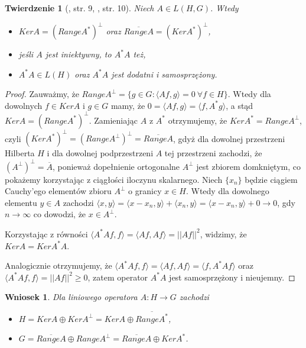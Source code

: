 \documentclass[man,mfiu]{mgrwms}
\newtheorem{tw}{Twierdzenie}[chapter]
\newtheorem{wn}{Wniosek}[chapter]
\begin{document}
\begin{tw}[\cite{iphde}, str. 9, \cite{kaipo}, str. 10] Niech $A\in L(H,G)$. Wtedy
\begin{itemize}
\item $KerA=(RangeA^*)^{\perp}$ oraz $\overline{RangeA}=(KerA^*)^{\perp}$,
\item jeśli $A$ jest iniektywny, to $A^*A$ też,
\item $A^*A\in L(H)$ oraz $A^*A$ jest dodatni i samosprzężony.
\end{itemize}
\end{tw}
\begin{proof}
Zauważmy, że $RangeA^{\perp}=\{g\in G\colon \langle Af,g\rangle =0\ \forall f\in H\}$. Wtedy dla dowolnych $f\in KerA$ i $g\in G$ mamy, że $0=\langle Af,g\rangle=\langle f,A^*g\rangle$, a stąd $KerA=(RangeA^*)^{\perp}$. Zamieniając $A$ z $A^*$ otrzymujemy, że $KerA^*=RangeA^{\perp}$, czyli $(KerA^*)^{\perp}=(RangeA^{\perp})^{\perp}=\overline{RangeA}$, gdyż dla dowolnej przestrzeni Hilberta $H$ i dla dowolnej podprzestrzeni $A$ tej przestrzeni zachodzi, że $(A^{\perp})^{\perp}=\overline{A}$, ponieważ dopełnienie ortogonalne $A^{\perp}$ jest zbiorem domkniętym, co pokażemy korzystając z ciągłości iloczynu skalarnego. Niech $\{x_n\}$ będzie ciągiem Cauchy'ego elementów zbioru $A^{\perp}$ o granicy $x\in H$. Wtedy dla dowolnego elementu $y\in A$ zachodzi $\langle x,y\rangle=\langle x-x_n,y\rangle + \langle x_n,y\rangle=\langle x-x_n,y\rangle + 0\to 0$, gdy $n\to \infty$ co dowodzi, że $x\in A^{\perp}$.

Korzystając z równości $\langle A^*Af,f\rangle=\langle Af,Af\rangle=||Af||^2$, widzimy, że $KerA=KerA^*A$.

Analogicznie otrzymujemy, że $\langle A^*Af,f\rangle=\langle Af,Af\rangle=\langle f, A^*Af\rangle$ oraz $\langle A^*Af, f\rangle=||Af||^2\geq 0$, zatem operator $A^*A$ jest samosprzężony i nieujemny.
\end{proof}
\begin{wn}Dla liniowego operatora $A\colon H \to G$ zachodzi
\begin{itemize}
\vspace{2mm}
\item $H=KerA \oplus KerA^{\perp}=KerA\oplus \overline{RangeA^*}$,
\vspace{2mm}
\item $G=\overline{RangeA}\oplus RangeA^{\perp}=\overline{RangeA}\oplus KerA^*$.
\vspace{2mm}
\end{itemize}
\end{wn}
\end{document}
